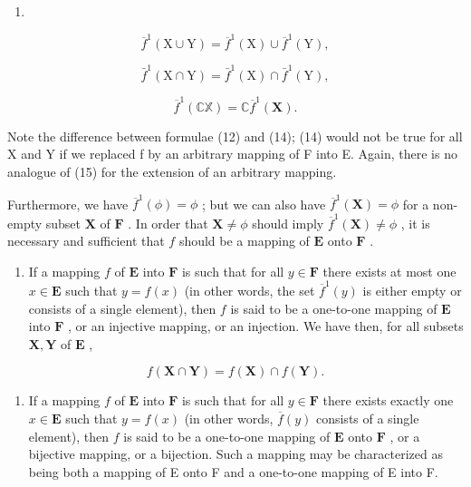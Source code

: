 \begin{enumerate}
\def\labelenumi{(\arabic{enumi})}
\setcounter{enumi}{12}
\tightlist
\item
\end{enumerate}

\[
\overline {{f}} ^ {1} (\mathrm{X} \cup \mathrm{Y}) = \overline {{f}} ^ {1} (\mathrm{X}) \cup \overline {{f}} ^ {1} (\mathrm{Y}),\tag{14}
\]

\[
\bar {f} ^ {1} (\mathrm{X} \cap \mathrm{Y}) = \bar {f} ^ {1} (\mathrm{X}) \cap \bar {f} ^ {1} (\mathrm{Y}),\tag{15}
\]

\[
\overline {{f}} ^ {1} (\mathbb {C X}) = \mathbb {C} \overline {{f}} ^ {1} (\mathbf {X}).
\]

Note the difference between formulae (12) and (14); (14) would not be true for all X and Y if we replaced f by an arbitrary mapping of F into E. Again, there is no analogue of (15) for the extension of an arbitrary mapping.

Furthermore, we have \(\overline{f}^{1}(\phi) = \phi\) ; but we can also have \(\overline{f}^{1}(\mathbf{X}) = \phi\) for a non-empty subset \(\mathbf{X}\) of \(\mathbf{F}\) . In order that \(\mathbf{X} \neq \phi\) should imply \(\overline{f}^{1}(\mathbf{X}) \neq \phi\) , it is necessary and sufficient that \(f\) should be a mapping of \(\mathbf{E}\) onto \(\mathbf{F}\) .

\begin{enumerate}
\def\labelenumi{\arabic{enumi}.}
\setcounter{enumi}{7}
\tightlist
\item
  If a mapping \(f\) of \(\mathbf{E}\) into \(\mathbf{F}\) is such that for all \(y \in \mathbf{F}\) there exists at most one \(x \in \mathbf{E}\) such that \(y = f(x)\) (in other words, the set \(\overline{f}^1(y)\) is either empty or consists of a single element), then \(f\) is said to be a one-to-one mapping of \(\mathbf{E}\) into \(\mathbf{F}\) , or an injective mapping, or an injection. We have then, for all subsets \(\mathbf{X}, \mathbf{Y}\) of \(\mathbf{E}\) ,
\end{enumerate}

\[
f (\mathbf {X} \cap \mathbf {Y}) = f (\mathbf {X}) \cap f (\mathbf {Y}).\tag{16}
\]

\begin{enumerate}
\def\labelenumi{\arabic{enumi}.}
\setcounter{enumi}{8}
\tightlist
\item
  If a mapping \(f\) of \(\mathbf{E}\) into \(\mathbf{F}\) is such that for all \(y \in \mathbf{F}\) there exists exactly one \(x \in \mathbf{E}\) such that \(y = f(x)\) (in other words, \(\overline{f}(y)\) consists of a single element), then \(f\) is said to be a one-to-one mapping of \(\mathbf{E}\) onto \(\mathbf{F}\) , or a bijective mapping, or a bijection. Such a mapping may be characterized as being both a mapping of E onto F and a one-to-one mapping of E into F.
\end{enumerate}

